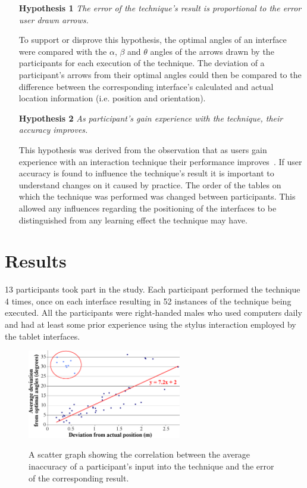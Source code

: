 \documentclass{bmcart}
\begin{document}
\begin{itemize}
\item[\textbf{Hypothesis 1}] {\emph{The error of the technique's result is proportional to the error user drawn arrows.}}

To support or disprove this hypothesis, the optimal angles of an interface were compared with the $\alpha$, $\beta$ and $\theta$ angles of the arrows drawn by the participants for each execution of the technique.
The deviation of a participant's arrows from their optimal angles could then be compared to the difference between the corresponding interface's calculated and actual location information (i.e. position and orientation).

\item[\textbf{Hypothesis 2}] {\emph{As participant's gain experience with the technique, their accuracy improves.}}

This hypothesis was derived from the observation that as users gain experience with an interaction technique their performance improves~\cite{Constantine1999}.
If user accuracy is found to influence the technique's result it is important to understand changes on it caused by practice.
The order of the tables on which the technique was performed was changed between participants.
This allowed any influences regarding the positioning of the interfaces to be distinguished from any learning effect the technique may have.
\end{itemize}


\section*{Results}\label{sec:results}  

13 participants took part in the study.
Each participant performed the technique 4 times, once on each interface resulting in 52 instances of the technique being executed.
All the participants were right-handed males who used computers daily and had at least some prior experience using the stylus interaction employed by the tablet interfaces.

\begin{figure}[h]
   \centering
   \caption{A scatter graph showing the correlation between the average inaccuracy of a participant's input into the technique and the error of the corresponding result.}
   \includegraphics[width=0.6\textwidth]{figures/angle_deviation_scatter.png}
   \label{fig:scatter}
\end{figure}
\end{document}
